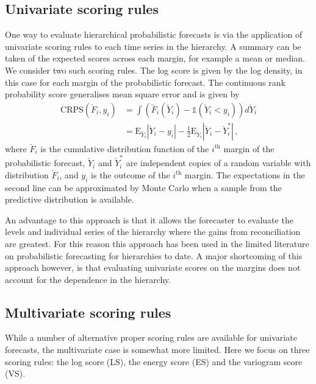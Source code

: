 \documentclass[12pt]{article}
\def\E{\text{E}}
\theoremstyle{definition}
\begin{document}
\subsection{Univariate scoring rules}

One way to evaluate hierarchical probabilistic forecasts is via the application of univariate scoring rules to each time series in the hierarchy. A summary can be taken of the expected scores across each margin, for example a mean or median. We consider two such scoring rules. The log score is given by the log density, in this case for each margin of the probabilistic forecast. The continuous rank probability score generalises mean square error and is given by
\begin{align} \label{eq:CRPS}
\text{CRPS}(\breve{F}_i,y_{i}) &=\int \left(\breve{F}_i(\breve{Y}_i)-\mathbb{1}(\breve{Y}_i<y_{i})\right)d\breve{Y}_i\\ &=\E_{\breve{Y}_i}|\breve{Y}_{i}-y_{i}| - \frac{1}{2}\E_{\breve{Y}_i}|\breve{Y}_{i}-\breve{Y}^*_{i}|\,,
\end{align}
where $\breve{F}_i$ is the cumulative distribution function of the $i^{\text{th}}$ margin of the probabilistic forecast, $\breve{Y}_i$ and $\breve{Y}^*_{i}$ are independent copies of a random variable with distribution $\breve{F}_i$, and $y_i$ is the outcome of the $i^{\text{th}}$ margin. The expectations in the second line can be approximated by Monte Carlo when a sample from the predictive distribution is available.

An advantage to this approach is that it allows the forecaster to evaluate the levels and individual series of the hierarchy where the gains from reconciliation are greatest. For this reason this approach has been used in the limited literature on probabilistic forecasting for hierarchies \citep{BenTaieb2017, JeoEtAl2019} to date. A major shortcoming of this approach however, is that evaluating univariate scores on the margins does not account for the dependence in the hierarchy.

\subsection{Multivariate scoring rules}

While a number of alternative proper scoring rules are available for univariate forecasts, the multivariate case is somewhat more limited. Here we focus on three scoring rules: the log score (LS), the energy score (ES) and the variogram score (VS). 
\end{document}
